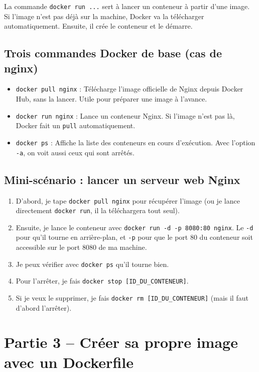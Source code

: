 \documentclass[12pt,a4paper]{article}
\begin{document}
La commande \texttt{docker run ...} sert à lancer un conteneur à partir d’une image. Si l’image n’est pas déjà sur la machine, Docker va la télécharger automatiquement. Ensuite, il crée le conteneur et le démarre.

\subsection{Trois commandes Docker de base (cas de nginx)}

\begin{itemize}
    \item \texttt{docker pull nginx} : Télécharge l’image officielle de Nginx depuis Docker Hub, sans la lancer. Utile pour préparer une image à l’avance.
    \item \texttt{docker run nginx} : Lance un conteneur Nginx. Si l’image n’est pas là, Docker fait un \texttt{pull} automatiquement.
    \item \texttt{docker ps} : Affiche la liste des conteneurs en cours d’exécution. Avec l’option \texttt{-a}, on voit aussi ceux qui sont arrêtés.
\end{itemize}

\subsection{Mini-scénario : lancer un serveur web Nginx}

\begin{enumerate}
    \item D’abord, je tape \texttt{docker pull nginx} pour récupérer l’image (ou je lance directement \texttt{docker run}, il la téléchargera tout seul).
    \item Ensuite, je lance le conteneur avec \texttt{docker run -d -p 8080:80 nginx}. Le \texttt{-d} pour qu’il tourne en arrière-plan, et \texttt{-p} pour que le port 80 du conteneur soit accessible sur le port 8080 de ma machine.
    \item Je peux vérifier avec \texttt{docker ps} qu’il tourne bien.
    \item Pour l’arrêter, je fais \texttt{docker stop [ID\_DU\_CONTENEUR]}.
    \item Si je veux le supprimer, je fais \texttt{docker rm [ID\_DU\_CONTENEUR]} (mais il faut d’abord l’arrêter).
\end{enumerate}

\section{Partie 3 – Créer sa propre image avec un Dockerfile}
\end{document}
